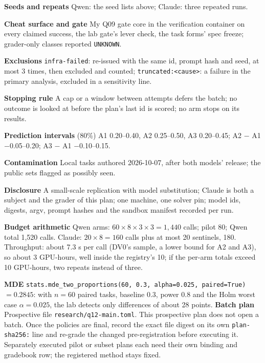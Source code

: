 \documentclass[11pt]{article}
\begin{document}
\begin{answer}
\textbf{Seeds and repeats} Qwen: the seed lists above; Claude: three repeated runs.

\textbf{Cheat surface and gate} My Q09 gate core in the verification container on every
claimed success, the lab gate's lever check, the task forms' spec freeze; grader-only
classes reported \texttt{UNKNOWN}.

\textbf{Exclusions} \texttt{infra-failed}: re-issued with the same id, prompt hash and
seed, at most 3 times, then excluded and counted; \texttt{truncated:<cause>}: a failure
in the primary analysis, excluded in a sensitivity line.

\textbf{Stopping rule} A cap or a window between attempts defers the batch; no outcome
is looked at before the plan's last id is scored; no arm stops on its results.

\textbf{Prediction intervals} (80\%) A1 0.20--0.40, A2 0.25--0.50, A3 0.20--0.45;
A2 $-$ A1 $-$0.05--0.20; A3 $-$ A1 $-$0.10--0.15.

\textbf{Contamination} Local tasks authored 2026-10-07, after both models' release;
the public sets flagged as possibly seen.

\textbf{Disclosure} A small-scale replication with model substitution; Claude is both a
subject and the grader of this plan; one machine, one solver pin; model ids, digests,
argv, prompt hashes and the sandbox manifest recorded per run.

\textbf{Budget arithmetic} Qwen arms: $60 \times 8 \times 3 \times 3 = 1{,}440$ calls;
pilot 80; Qwen total 1,520 calls. Claude: $20 \times 8 = 160$ calls plus at most 20
sentinels, 180. Throughput: about 7.3 s per call (DV0's sample, a lower bound for A2
and A3), so about 3 GPU-hours, well inside the registry's 10; if the per-arm totals
exceed 10 GPU-hours, two repeats instead of three.

\textbf{MDE} \texttt{stats.mde\_two\_proportions(60, 0.3, alpha=0.025, paired=True)}
$= 0.2845$: with $n = 60$ paired tasks, baseline 0.3, power 0.8 and the Holm worst case
$\alpha = 0.025$, the lab detects only differences of about 28 points.
\textbf{Batch plan} Prospective file \texttt{research/q12-main.toml}.
This prospective plan does not open a batch. Once the policies are final,
record the exact file digest on its own \texttt{plan-sha256:} line and
re-grade the changed pre-registration before executing it. Separately
executed pilot or subset plans each need their own binding and gradebook
row; the registered method stays fixed.
\end{answer}
\end{document}
